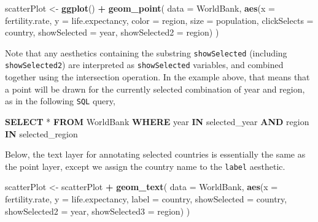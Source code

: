 \documentclass[12pt,]{article}
\newenvironment{Shaded}{\begin{snugshade}}{\end{snugshade}}
\newcommand{\DataTypeTok}[1]{\textcolor[rgb]{0.13,0.29,0.53}{#1}}
\newcommand{\KeywordTok}[1]{\textcolor[rgb]{0.13,0.29,0.53}{\textbf{#1}}}
\newcommand{\NormalTok}[1]{#1}
\newcommand{\OperatorTok}[1]{\textcolor[rgb]{0.81,0.36,0.00}{\textbf{#1}}}
\newcommand{\StringTok}[1]{\textcolor[rgb]{0.31,0.60,0.02}{#1}}
\theoremstyle{definition}
\theoremstyle{definition}
\theoremstyle{definition}
\theoremstyle{remark}
\begin{document}
\begin{Shaded}
\begin{Highlighting}[]
\NormalTok{scatterPlot <-}\StringTok{ }\KeywordTok{ggplot}\NormalTok{() }\OperatorTok{+}\StringTok{ }\KeywordTok{geom_point}\NormalTok{(}
  \DataTypeTok{data =}\NormalTok{ WorldBank,}
  \KeywordTok{aes}\NormalTok{(}\DataTypeTok{x =}\NormalTok{ fertility.rate, }\DataTypeTok{y =}\NormalTok{ life.expectancy,}
      \DataTypeTok{color =}\NormalTok{ region, }\DataTypeTok{size =}\NormalTok{ population,}
      \DataTypeTok{clickSelects =}\NormalTok{ country,}
      \DataTypeTok{showSelected =}\NormalTok{ year,}
      \DataTypeTok{showSelected2 =}\NormalTok{ region)}
\NormalTok{)}
\end{Highlighting}
\end{Shaded}

Note that any aesthetics containing the substring \texttt{showSelected}
(including \texttt{showSelected2}) are interpreted as
\texttt{showSelected} variables, and combined together using the
intersection operation. In the example above, that means that a point
will be drawn for the currently selected combination of year and region,
as in the following \texttt{SQL} query,

\begin{Shaded}
\begin{Highlighting}[]
\KeywordTok{SELECT}\NormalTok{ * }\KeywordTok{FROM}\NormalTok{ WorldBank}
  \KeywordTok{WHERE} \DataTypeTok{year}   \KeywordTok{IN}\NormalTok{ selected_year}
  \KeywordTok{AND}\NormalTok{   region }\KeywordTok{IN}\NormalTok{ selected_region}
\end{Highlighting}
\end{Shaded}

Below, the text layer for annotating selected countries is essentially
the same as the point layer, except we assign the country name to the
\texttt{label} aesthetic.

\begin{Shaded}
\begin{Highlighting}[]
\NormalTok{scatterPlot <-}\StringTok{ }\NormalTok{scatterPlot }\OperatorTok{+}\StringTok{ }\KeywordTok{geom_text}\NormalTok{(}
  \DataTypeTok{data =}\NormalTok{ WorldBank,}
  \KeywordTok{aes}\NormalTok{(}\DataTypeTok{x =}\NormalTok{ fertility.rate, }\DataTypeTok{y =}\NormalTok{ life.expectancy,}
      \DataTypeTok{label =}\NormalTok{ country,}
      \DataTypeTok{showSelected =}\NormalTok{ country,}
      \DataTypeTok{showSelected2 =}\NormalTok{ year,}
      \DataTypeTok{showSelected3 =}\NormalTok{ region)}
\NormalTok{)}
\end{Highlighting}
\end{Shaded}
\end{document}
